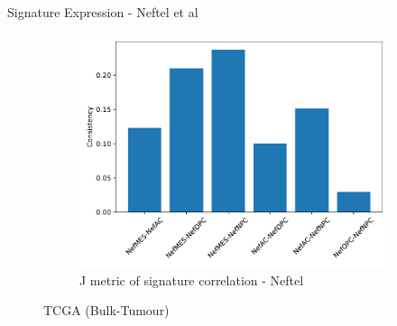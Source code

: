 \documentclass[aspectratio=169,9pt]{beamer}
\begin{document}
\begin{frame}{Signature Expression - Neftel et al}
\begin{adjustwidth}{-5cm}{-5cm}
\begin{figure}
\begin{subfigure}[c]{0.4\textwidth}
                    \includegraphics[width=\textwidth]{TCGA_Consistency_Nef}
                    \caption{J metric of signature correlation - Neftel}
                \end{subfigure}
                \caption{TCGA (Bulk-Tumour)}
            \end{figure}
        \end{adjustwidth}
    \end{frame}
\end{document}

